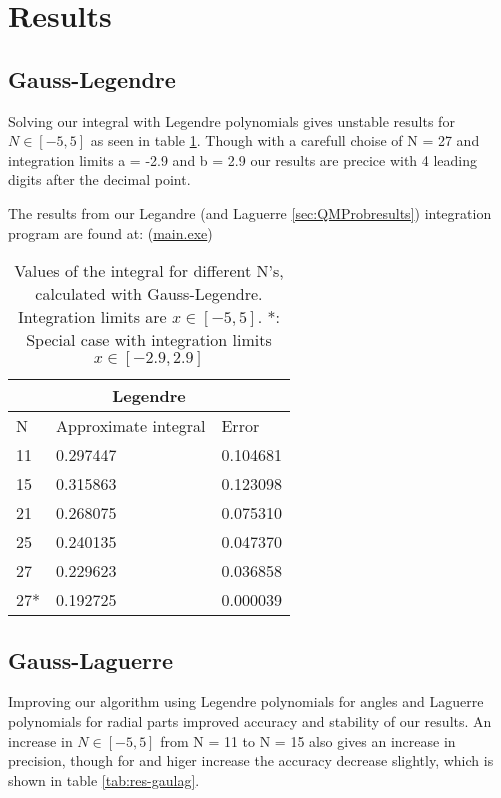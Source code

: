 \documentclass[../main.tex]{subfiles}
\begin{document}
\section{Results} \label{sec:results}
\subsection{Gauss-Legendre} \label{sec:QMGausslegresults}

Solving our integral with Legendre polynomials gives unstable results for $N \in [-5,5]$ as seen in table \ref{tab:res-gauleg}. Though with a carefull choise of N = 27 and integration limits a = -2.9 and b = 2.9 our results are precice with 4 leading digits after the decimal point.

The results from our Legandre (and Laguerre \ref{sec:QMProbresults}) integration program are found at: (\href{https://github.com/kmaasrud/Project-3/tree/master/code/Gauss-Quadrature}{main.exe})

\begin{table}[h!]
\begin{center}
  \begin{tabular}{ |p{1cm}|p{4cm}|p{3cm}|}
 \hline
 \multicolumn{3}{|c|}{\textbf{Legendre}} \\
 \hline
       N   &Approximate integral & Error\\
 \hline
 11 & 0.297447 & 0.104681\\
 15 & 0.315863 & 0.123098\\
 21 & 0.268075 & 0.075310\\
 25 & 0.240135 & 0.047370\\
 27 & 0.229623 & 0.036858\\
 27*& 0.192725 & 0.000039\\
 \hline
 \end{tabular}
 \caption{Values of the integral for different N's, calculated with Gauss-Legendre. Integration limits are $x\in[-5,5]$. *: Special case with integration limits $x\in[-2.9,2.9]$}
 \label{tab:res-gauleg}
 \end{center}
\end{table}


\subsection{Gauss-Laguerre} \label{sec:QMQMGausslagresults}
Improving our algorithm using Legendre polynomials for angles and Laguerre polynomials for radial parts improved accuracy and stability of our results. An increase in $N \in [-5,5]$ from N = 11 to N = 15 also gives an increase in precision, though for and higer increase the accuracy decrease slightly, which is shown in table \ref{tab:res-gaulag}.
\end{document}
